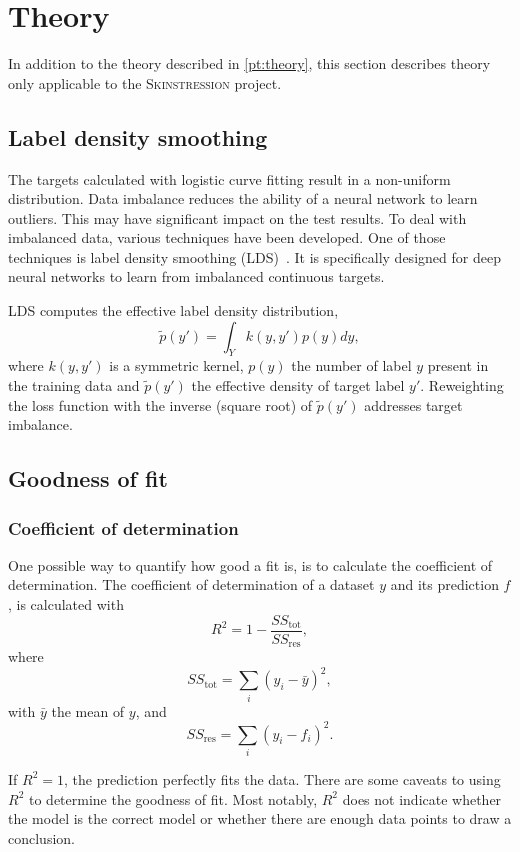 \chapter{Theory}

In addition to the theory described in \cref{pt:theory}, this section describes theory only applicable to the \textsc{Skinstression} project.


\section{Label density smoothing}
The targets calculated with logistic curve fitting result in a non-uniform distribution.
Data imbalance reduces the ability of a neural network to learn outliers.
This may have significant impact on the test results.
To deal with imbalanced data, various techniques have been developed.
One of those techniques is label density smoothing (LDS)~\cite{yang2021delving}.
It is specifically designed for deep neural networks to learn from imbalanced continuous targets.

\newcommand{\edtl}{$\tilde{p}(y')$ }
LDS computes the effective label density distribution,
\begin{equation}
    \tilde{p}(y') = \int_Y k(y, y')p(y)dy,
\end{equation}
where $k(y,y')$ is a symmetric kernel, $p(y)$ the number of label $y$ present in the training data and \edtl the effective density of target label $y'$.
Reweighting the loss function with the inverse (square root) of \edtl addresses target imbalance.

\section{Goodness of fit}

\subsection{Coefficient of determination}\label{subsec:coef_det}
One possible way to quantify how good a fit is, is to calculate the coefficient of determination.
The coefficient of determination of a dataset $y$ and its prediction $f$, is calculated with
\begin{equation}
    R^2 = 1 - \frac{SS_\mathrm{tot}}{SS_\mathrm{res}},
\end{equation}
where
\begin{equation}
    SS_\mathrm{tot} = \sum_i (y_i - \bar{y})^2,
\end{equation}
with $\bar{y}$ the mean of $y$, and
\begin{equation}
    SS_\mathrm{res} = \sum_i (y_i - f_i)^2.
\end{equation}

If $R^2 = 1$, the prediction perfectly fits the data.
There are some caveats to using $R^2$ to determine the goodness of fit.
Most notably, $R^2$ does not indicate whether the model is the correct model or whether there are enough data points to draw a conclusion.
